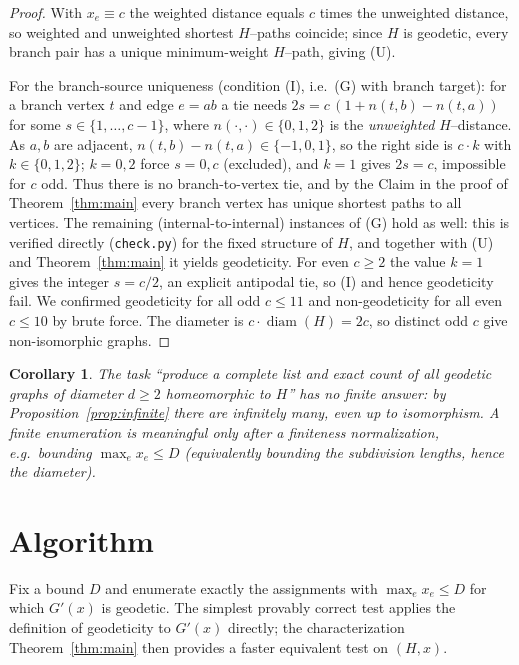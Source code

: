 \documentclass{amsart}
\newtheorem{corollary}{Corollary}
\theoremstyle{definition}
\begin{document}
\begin{proof}
With $x_e\equiv c$ the weighted distance equals $c$ times the unweighted
distance, so weighted and unweighted shortest $H$--paths coincide; since $H$ is
geodetic, every branch pair has a unique minimum-weight $H$--path, giving (U).

For the branch-source uniqueness (condition (I), i.e.\ (G) with branch target):
for a branch vertex $t$ and edge $e=ab$ a tie needs $2s=c\,(1+n(t,b)-n(t,a))$ for
some $s\in\{1,\dots,c-1\}$, where $n(\cdot,\cdot)\in\{0,1,2\}$ is the
\emph{unweighted} $H$--distance. As $a,b$ are adjacent, $n(t,b)-n(t,a)\in
\{-1,0,1\}$, so the right side is $c\cdot k$ with $k\in\{0,1,2\}$; $k=0,2$ force
$s=0,c$ (excluded), and $k=1$ gives $2s=c$, impossible for $c$ odd. Thus there is
no branch-to-vertex tie, and by the Claim in the proof of
Theorem~\ref{thm:main} every branch vertex has unique shortest paths to all
vertices. The remaining (internal-to-internal) instances of (G) hold as well:
this is verified directly (\texttt{check.py}) for the fixed structure of $H$, and
together with (U) and Theorem~\ref{thm:main} it yields geodeticity. For even
$c\ge2$ the value $k=1$ gives the integer $s=c/2$, an explicit antipodal tie, so
(I) and hence geodeticity fail. We confirmed geodeticity for all odd $c\le11$ and
non-geodeticity for all even $c\le10$ by brute force. The diameter is
$c\cdot\operatorname{diam}(H)=2c$, so distinct odd $c$ give non-isomorphic
graphs.
\end{proof}

\begin{corollary}\label{cor:illposed}
The task ``produce a complete list and exact \emph{count} of all geodetic graphs
of diameter $d\ge2$ homeomorphic to $H$'' has no finite answer: by
Proposition~\ref{prop:infinite} there are infinitely many, even up to
isomorphism. A finite enumeration is meaningful only after a finiteness
normalization, e.g.\ bounding $\max_e x_e\le D$ (equivalently bounding the
subdivision lengths, hence the diameter).
\end{corollary}

\section{Algorithm}

Fix a bound $D$ and enumerate exactly the assignments with $\max_e x_e\le D$
for which $G'(x)$ is geodetic. The simplest provably correct test applies the
definition of geodeticity to $G'(x)$ directly; the characterization
Theorem~\ref{thm:main} then provides a faster equivalent test on $(H,x)$.
\end{document}
